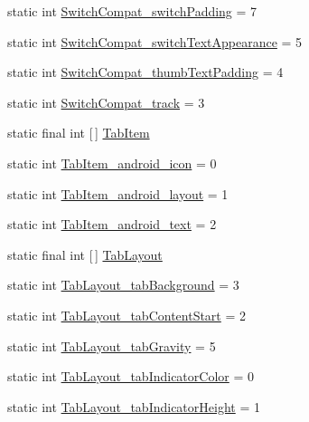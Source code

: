 \begin{DoxyCompactItemize}
\item 
static int \hyperlink{classandroid_1_1support_1_1design_1_1R_1_1styleable_aa2d2bf8e29bf1a8f4af8c7cdbd15941c}{Switch\+Compat\+\_\+switch\+Padding} = 7
\item 
static int \hyperlink{classandroid_1_1support_1_1design_1_1R_1_1styleable_ace25056c20b815fd199613151dcea0ec}{Switch\+Compat\+\_\+switch\+Text\+Appearance} = 5
\item 
static int \hyperlink{classandroid_1_1support_1_1design_1_1R_1_1styleable_a290e7ab17d9a3766ad3a7eea769ed634}{Switch\+Compat\+\_\+thumb\+Text\+Padding} = 4
\item 
static int \hyperlink{classandroid_1_1support_1_1design_1_1R_1_1styleable_a0b29ddbc27c35a3656e2bf93985678a8}{Switch\+Compat\+\_\+track} = 3
\item 
static final int \mbox{[}$\,$\mbox{]} \hyperlink{classandroid_1_1support_1_1design_1_1R_1_1styleable_a244f187ed8d4ed589f36e6db741d19e8}{Tab\+Item}
\item 
static int \hyperlink{classandroid_1_1support_1_1design_1_1R_1_1styleable_a4ae9b477045359eaafd1e5190d205b23}{Tab\+Item\+\_\+android\+\_\+icon} = 0
\item 
static int \hyperlink{classandroid_1_1support_1_1design_1_1R_1_1styleable_ad532b6a8667261e64cc67f83928037dd}{Tab\+Item\+\_\+android\+\_\+layout} = 1
\item 
static int \hyperlink{classandroid_1_1support_1_1design_1_1R_1_1styleable_acc3aa4481a2a0607245faab284197fcf}{Tab\+Item\+\_\+android\+\_\+text} = 2
\item 
static final int \mbox{[}$\,$\mbox{]} \hyperlink{classandroid_1_1support_1_1design_1_1R_1_1styleable_a514b47b47f600f9421b65f4f0aa832d6}{Tab\+Layout}
\item 
static int \hyperlink{classandroid_1_1support_1_1design_1_1R_1_1styleable_a520d2db5d68381c7d9477e52942fbdc4}{Tab\+Layout\+\_\+tab\+Background} = 3
\item 
static int \hyperlink{classandroid_1_1support_1_1design_1_1R_1_1styleable_a45fca30d8fcae06a2922ea877aa726b2}{Tab\+Layout\+\_\+tab\+Content\+Start} = 2
\item 
static int \hyperlink{classandroid_1_1support_1_1design_1_1R_1_1styleable_afba6408f9364ca3427b36d591ce6563f}{Tab\+Layout\+\_\+tab\+Gravity} = 5
\item 
static int \hyperlink{classandroid_1_1support_1_1design_1_1R_1_1styleable_a8dfd23af824aaddd41960c0c43bae554}{Tab\+Layout\+\_\+tab\+Indicator\+Color} = 0
\item 
static int \hyperlink{classandroid_1_1support_1_1design_1_1R_1_1styleable_a29ccf4ce74e5f86bb3d08031376f07ce}{Tab\+Layout\+\_\+tab\+Indicator\+Height} = 1

\end{DoxyCompactItemize}
